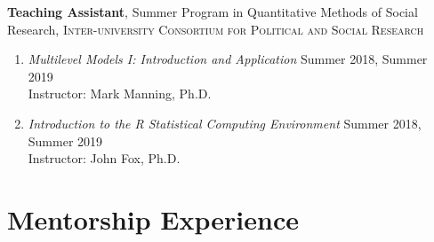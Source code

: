 \documentclass[letterpaper,11pt]{article} %
\begin{document}
		\noindent\textbf{Teaching Assistant}, Summer Program in Quantitative Methods of Social Research, \textsc{Inter-university Consortium for Political and Social Research}
		\begin{enumerate}
			\item \textit{Multilevel Models I: Introduction and Application} \hfill Summer 2018, Summer 2019\\
			Instructor: Mark Manning, Ph.D.
			
			\item \textit{Introduction to the R Statistical Computing Environment} \hfill Summer 2018, Summer 2019 \\
			Instructor: John Fox, Ph.D.
		\end{enumerate}
	

    \section*{Mentorship Experience}
\end{document}
